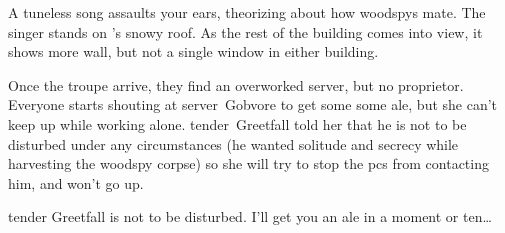 \documentclass[10pt,twoside]{book}
\begin{document}


\begin{boxtext}
  A tuneless song assaults your ears, theorizing about how \glspl{woodspy} mate.
  The singer stands on 's
  \ifnum{} snowy \fi
  roof.
  As the rest of the building comes into view, it shows more wall, but not a single window in either building.
\end{boxtext}

Once the troupe arrive, they find an overworked \gls{server}, but no proprietor.
Everyone starts shouting at \gls{server}~Gobvore to get some some ale, but she can't keep up while working alone.
\Gls{tender}~Greetfall told her that he is not to be disturbed under any circumstances (he wanted solitude and secrecy while \gls{harvesting} the \gls{woodspy} corpse) so she will try to stop the \glspl{pc} from contacting him, and won't go up.

\begin{speechtext}
  \Gls{tender} Greetfall is not to be disturbed.
  I'll get you an ale in a moment or ten\ldots
\end{speechtext}

\end{document}
